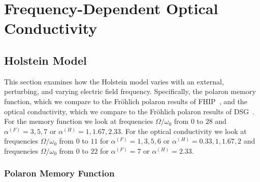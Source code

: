 \section{Frequency-Dependent Optical Conductivity}
\label{sec:5-2}

\subsection{Holstein Model}
\label{subsec:5-2-1}

This section examines how the Holstein model varies with an external, perturbing, and varying electric field frequency. Specifically, the polaron memory function, which we compare to the Fr\"ohlich polaron results of FHIP~\cite{feynman_mobility_1962}, and the optical conductivity, which we compare to the Fr\"ohlich polaron results of DSG~\cite{devreese_optical_1972}. For the memory function we look at frequencies $\Omega / \omega_0$ from $0$ to $28$ and $\alpha^{(F)} = 3, 5, 7$ or $\alpha^{(H)} = 1, 1.67, 2.33$. For the optical conductivity we look at frequencies $\Omega / \omega_0$ from $0$ to $11$ for $\alpha^{(F)} = 1, 3, 5, 6$ or $\alpha^{(H)} = 0.33, 1, 1.67, 2$ and frequencies $\Omega / \omega_0$ from $0$ to $22$ for $\alpha^{(F)} = 7$ or $\alpha^{(H)} = 2.33$. 

\subsubsection{Polaron Memory Function}

